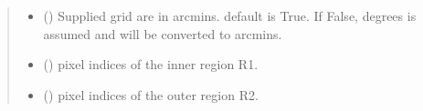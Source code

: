 \documentclass[letterpaper,10pt,english]{sphinxmanual}
\begin{document}
\begin{fulllineitems}
\begin{quote}
\begin{description}
\begin{itemize}
\item {} 
\sphinxAtStartPar
{} () \textendash{} Supplied grid are in arcmins.
default is True.
If False, degrees is assumed and will be converted to arcmins.

\end{itemize}

\sphinxAtStartPar
\begin{itemize}
\item {} 
\sphinxAtStartPar
{} () \textendash{} pixel indices of the inner region R1.

\item {} 
\sphinxAtStartPar
{} () \textendash{} pixel indices of the outer region R2.

\end{itemize}


\end{description}\end{quote}

\end{fulllineitems}

\end{document}

